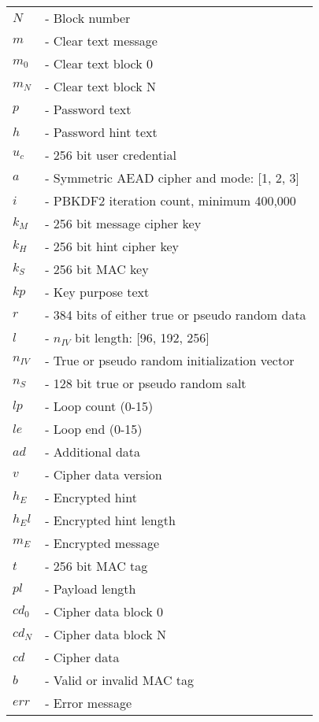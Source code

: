 \documentclass{article}
\begin{document}
\begin{tabular}{@{}p{2mm} l}
$N$ & \textrm{ - Block number}\\
$m$ & \textrm{ - Clear text message}\\
$m_0$ & \textrm{ - Clear text block 0}\\
$m_N$ & \textrm{ - Clear text block N}\\
$p$ & \textrm{ - Password text}\\
$h$ & \textrm{ - Password hint text}\\
$u_c$ & \textrm{ - 256 bit user credential}\\
$a$ & \textrm{ - Symmetric AEAD cipher and mode: [1, 2, 3]}\\
$i$ & \textrm{ - PBKDF2 iteration count, minimum 400,000}\\
$k_M$ & \textrm{ - 256 bit message cipher key}\\
$k_H$ & \textrm{ - 256 bit hint cipher key}\\
$k_S$ & \textrm{ - 256 bit MAC key}\\
$kp$ & \textrm{ - Key purpose text}\\
$r$ & \textrm{ - 384 bits of either true or pseudo random data}\\
$l$ & \textrm{ - }$n_{IV}$\textrm{ bit length: [96, 192, 256]}\\
$n_{IV}$ & \textrm{ - True or pseudo random initialization vector}\\
$n_S$ & \textrm{ - 128 bit true or pseudo random salt}\\
$lp$ & \textrm{ - Loop count (0-15)}\\
$le$ & \textrm{ - Loop end (0-15)}\\
$ad$ & \textrm{ - Additional data}\\
$v$ & \textrm{ - Cipher data version}\\
$h_E$ & \textrm{ - Encrypted hint}\\
$h_El$ & \textrm{ - Encrypted hint length}\\
$m_E$ & \textrm{ - Encrypted message}\\
$t$ & \textrm{ - 256 bit MAC tag}\\
$pl$ & \textrm{ - Payload length}\\
$cd_0$ & \textrm{ - Cipher data block 0}\\
$cd_N$ & \textrm{ - Cipher data block N}\\
$cd$ & \textrm{ - Cipher data}\\
$b$ & \textrm{ - Valid or invalid MAC tag}\\
$err$ & \textrm{ - Error message}\\
\end{tabular}
\end{document}

